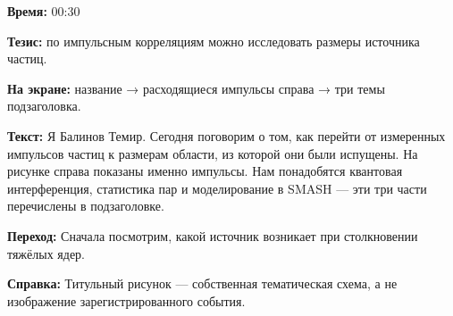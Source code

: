 \textbf{Время:} 00:30

\textbf{Тезис:} по импульсным корреляциям можно исследовать размеры источника частиц.

\textbf{На экране:} название → расходящиеся импульсы справа → три темы подзаголовка.

\textbf{Текст:} Я Балинов Темир. Сегодня поговорим о том, как перейти от измеренных импульсов частиц к размерам области, из которой они были испущены. На рисунке справа показаны именно импульсы. Нам понадобятся квантовая интерференция, статистика пар и моделирование в SMASH — эти три части перечислены в подзаголовке.

\textbf{Переход:} Сначала посмотрим, какой источник возникает при столкновении тяжёлых ядер.

\textbf{Справка:} Титульный рисунок — собственная тематическая схема, а не изображение зарегистрированного события.
